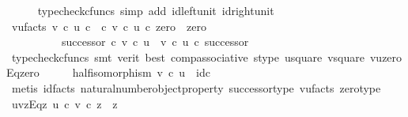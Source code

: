 \begin{isabellebody}
\ \ \ \ \isamarkupfalse%
\ {\isacharparenleft}{\kern0pt}typecheck{\isacharunderscore}{\kern0pt}cfuncs{\isacharcomma}{\kern0pt}\ simp\ add{\isacharcolon}{\kern0pt}\ id{\isacharunderscore}{\kern0pt}left{\isacharunderscore}{\kern0pt}unit{}\ id{\isacharunderscore}{\kern0pt}right{\isacharunderscore}{\kern0pt}unit{}{\isacharparenright}{\kern0pt}\isanewline
\ \ \isamarkupfalse%
\ \isamarkupfalse%
\ vu{\isacharunderscore}{\kern0pt}facts{\isacharcolon}{\kern0pt}\ {\isachardoublequoteopen}v\ {\isasymcirc}\isactrlsub c\ u{\isacharcolon}{\kern0pt}\ {\isasymnat}\isactrlsub c\ {\isasymrightarrow}\ {\isasymnat}\isactrlsub c{\isasymand}\ {\isacharparenleft}{\kern0pt}v\ {\isasymcirc}\isactrlsub c\ u{\isacharparenright}{\kern0pt}\ {\isasymcirc}\isactrlsub c\ zero\ {\isacharequal}{\kern0pt}\ zero\ {\isasymand}\ \isanewline
\ \ \ \ \ \ \ \ \ \ successor\ {\isasymcirc}\isactrlsub c\ {\isacharparenleft}{\kern0pt}v\ {\isasymcirc}\isactrlsub c\ u{\isacharparenright}{\kern0pt}\ {\isacharequal}{\kern0pt}\ {\isacharparenleft}{\kern0pt}v\ {\isasymcirc}\isactrlsub c\ u{\isacharparenright}{\kern0pt}\ {\isasymcirc}\isactrlsub c\ successor{\isachardoublequoteclose}\isanewline
\ \ \ \ \isamarkupfalse%
\ {\isacharparenleft}{\kern0pt}typecheck{\isacharunderscore}{\kern0pt}cfuncs{\isacharcomma}{\kern0pt}\ smt\ {\isacharparenleft}{\kern0pt}verit{\isacharcomma}{\kern0pt}\ best{\isacharparenright}{\kern0pt}\ comp{\isacharunderscore}{\kern0pt}associative{}\ s{\isacharunderscore}{\kern0pt}type\ u{\isacharunderscore}{\kern0pt}square\ v{\isacharunderscore}{\kern0pt}square\ vuzeroEqzero{\isacharparenright}{\kern0pt}\isanewline
\ \ \isamarkupfalse%
\ \isamarkupfalse%
\ half{\isacharunderscore}{\kern0pt}isomorphism{\isacharcolon}{\kern0pt}\ {\isachardoublequoteopen}{\isacharparenleft}{\kern0pt}v\ {\isasymcirc}\isactrlsub c\ u{\isacharparenright}{\kern0pt}\ {\isacharequal}{\kern0pt}\ id{\isacharparenleft}{\kern0pt}{\isasymnat}\isactrlsub c{\isacharparenright}{\kern0pt}{\isachardoublequoteclose}\isanewline
\ \ \ \ \isamarkupfalse%
\ {\isacharparenleft}{\kern0pt}metis\ id{\isacharunderscore}{\kern0pt}facts{}\ natural{\isacharunderscore}{\kern0pt}number{\isacharunderscore}{\kern0pt}object{\isacharunderscore}{\kern0pt}property\ successor{\isacharunderscore}{\kern0pt}type\ vu{\isacharunderscore}{\kern0pt}facts\ zero{\isacharunderscore}{\kern0pt}type{\isacharparenright}{\kern0pt}\isanewline
\ \ \isamarkupfalse%
\ uvzEqz{\isacharcolon}{\kern0pt}\ {\isachardoublequoteopen}u\ {\isasymcirc}\isactrlsub c\ {\isacharparenleft}{\kern0pt}v\ {\isasymcirc}\isactrlsub c\ z{\isacharparenright}{\kern0pt}\ {\isacharequal}{\kern0pt}\ z{\isachardoublequoteclose}\isanewline

\end{isabellebody}

